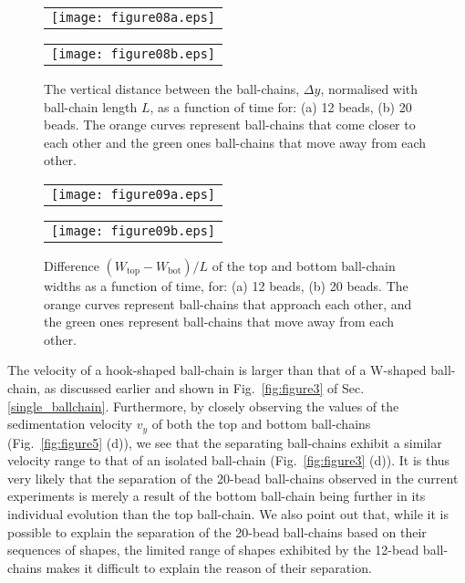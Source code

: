 \documentclass{article}
\begin{document}
\begin{figure*}[t!]
 \centering
 \begin{tabular}[b]{c}
  \texttt{[image: figure08a.eps]}
 \end{tabular}
 \begin{tabular}[b]{c}
  \texttt{[image: figure08b.eps]}
 \end{tabular}\vspace{-0.3cm}
 \caption{%
 The vertical distance between the ball-chains, $\Delta y$,  normalised with ball-chain length $L$, as a function of time for: (a) 12 beads, (b) 20 beads. The orange curves represent ball-chains that come closer to each other and the green ones ball-chains that move away from each other.}
 \label{fig:figure7}
\end{figure*}
\begin{figure*}[t!]
 \centering
 \begin{tabular}[b]{c}
  \texttt{[image: figure09a.eps]}
 \end{tabular}
 \begin{tabular}[b]{c}
  \texttt{[image: figure09b.eps]}
 \end{tabular}\vspace{-0.3cm}
 \caption{Difference  $(W_\text{{top}} - W_\text{{bot}})/L$ of the top and bottom ball-chain widths %
 as a function of time, for: (a) 12 beads, (b) 20 beads. The orange curves represent ball-chains that approach each other, and the green ones represent ball-chains that move away from each other.}%
 \label{fig:figure8}
\end{figure*}
The velocity of a hook-shaped ball-chain is larger than that of a W-shaped ball-chain, as discussed earlier and shown in Fig.~\ref{fig:figure3} of Sec. \ref{single_ballchain}. Furthermore, %
by closely observing the values of the sedimentation velocity $v_y$ of both the top and bottom ball-chains (Fig.~\ref{fig:figure5} (d)), we see that the separating ball-chains exhibit a similar velocity range to that of an isolated ball-chain (Fig.~\ref{fig:figure3} (d)). %
It is thus very likely that the separation of the 20-bead ball-chains observed in the current experiments is merely a result of the bottom ball-chain being further in its individual evolution than the top ball-chain. We also point out that, while it is possible to explain the separation of the 20-bead ball-chains based on their sequences of shapes, %
the limited range of shapes %
exhibited by the 12-bead ball-chains makes it difficult to explain the reason of their separation. 
\end{document}

